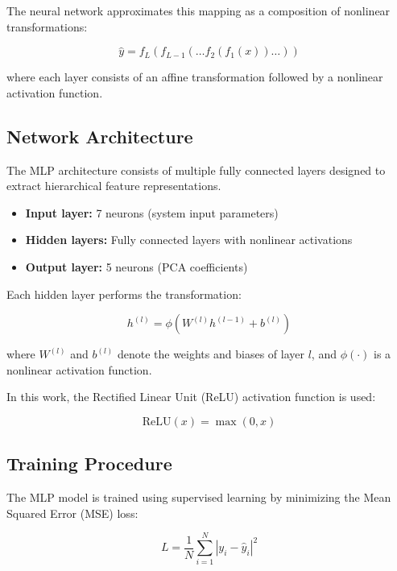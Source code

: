 The neural network approximates this mapping as a composition of nonlinear transformations:

\begin{equation}
\hat{y} = f_L(f_{L-1}(\dots f_2(f_1(x)) \dots))
\end{equation}

where each layer consists of an affine transformation followed by a nonlinear activation function.

\subsection{Network Architecture}

The MLP architecture consists of multiple fully connected layers designed to extract hierarchical feature representations.

\begin{itemize}
\item \textbf{Input layer:} 7 neurons (system input parameters)
\item \textbf{Hidden layers:} Fully connected layers with nonlinear activations
\item \textbf{Output layer:} 5 neurons (PCA coefficients)
\end{itemize}

Each hidden layer performs the transformation:

\begin{equation}
h^{(l)} = \phi \left( W^{(l)} h^{(l-1)} + b^{(l)} \right)
\end{equation}

where $W^{(l)}$ and $b^{(l)}$ denote the weights and biases of layer $l$, and $\phi(\cdot)$ is a nonlinear activation function.

In this work, the Rectified Linear Unit (ReLU) activation function is used:

\begin{equation}
\text{ReLU}(x) = \max(0, x)
\end{equation}

\subsection{Training Procedure}

The MLP model is trained using supervised learning by minimizing the Mean Squared Error (MSE) loss:

\begin{equation}
L = \frac{1}{N} \sum_{i=1}^{N} | y_i - \hat{y}_i |^2
\end{equation}

